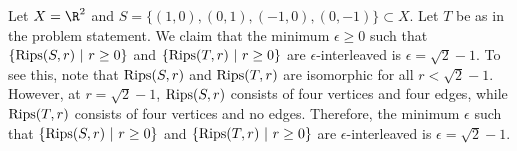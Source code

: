 \begin{solution}
  Let $X = \R^2$ and $S = \{(1, 0), (0, 1), (-1, 0), (0, -1)\} \subset X$. Let $T$ be as in the problem statement. We claim that the minimum $\epsilon \ge 0$ such that $\{\operatorname{Rips}(S, r)~|~r \ge 0\}$ and $\{\operatorname{Rips}(T, r)~|~r \ge 0\}$ are $\epsilon$-interleaved is $\epsilon = \sqrt{2} - 1$. To see this, note that $\operatorname{Rips}(S, r)$ and $\operatorname{Rips}(T, r)$ are isomorphic for all $r < \sqrt{2} - 1$. However, at $r = \sqrt{2} - 1$, $\operatorname{Rips}(S, r)$ consists of four vertices and four edges, while $\operatorname{Rips}(T, r)$ consists of four vertices and no edges. Therefore, the minimum $\epsilon$ such that $\{\operatorname{Rips}(S, r)~|~r \ge 0\}$ and $\{\operatorname{Rips}(T, r)~|~r \ge 0\}$ are $\epsilon$-interleaved is $\epsilon = \sqrt{2} - 1$.
\end{solution}

